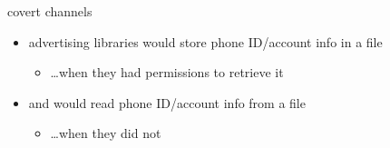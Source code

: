 \begin{frame}{covert channels}
    \begin{itemize}
    \item advertising libraries would store phone ID/account info in a file
        \begin{itemize}
        \item \ldots when they had permissions to retrieve it
        \end{itemize}
    \item and would read phone ID/account info from a file
        \begin{itemize}
        \item \ldots when they did not
        \end{itemize}
    \end{itemize}
\end{frame}
